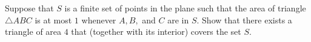 Suppose that $S$ is a finite set of points in the plane such that the area of triangle $\triangle ABC$ is at most $1$ whenever $A,B,$ and $C$ are in $S.$ Show that there exists a triangle of area $4$ that (together with its interior) covers the set $S.$